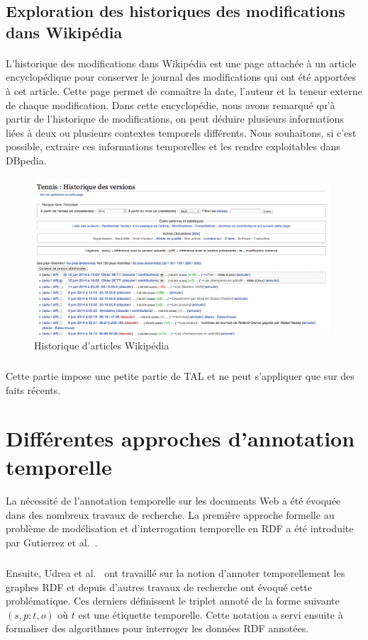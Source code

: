 \subsection{Exploration des historiques des modifications dans Wikipédia}
\paragraph{}
L'historique des modifications dans Wikipédia est une page attachée à un article encyclopédique pour conserver le journal des modifications qui ont été apportées à cet article. Cette page permet de connaître la date, l'auteur et la teneur externe de chaque modification.
Dans cette encyclopédie, nous avons remarqué qu'à partir de l'historique de modifications, on peut déduire plusieurs informations liées à deux ou plusieurs contextes temporels différents.
Nous souhaitons, si c’est possible, extraire ces informations temporelles et les rendre exploitables dans DBpedia.
\begin{figure}[H]
\centering
\includegraphics[width=11cm]{NEWHISTORIQUE.png}
\caption{Historique d'articles Wikipédia}
\end{figure}
\subparagraph{}
Cette partie impose une petite partie de TAL et ne peut s'appliquer que sur des faits récents.
\section{Différentes approches d'annotation temporelle}			
\paragraph{}
La nécessité de l’annotation temporelle sur les documents Web a été évoquée dans des nombreux travaux de recherche. La première approche formelle au problème de modélisation et d’interrogation temporelle en RDF a été introduite par Gutierrez et al.~\cite{gutierrez2005}.
\subparagraph{}
Ensuite, Udrea et al.~\cite{udrea2006} ont travaillé sur la notion d'annoter temporellement les graphes RDF et depuis d'autres travaux de recherche ont évoqué cette problématique.
Ces derniers définissent le triplet annoté de la forme suivante $(s,p:t,o)$ où $t$ est une étiquette temporelle. Cette notation a servi ensuite à formaliser des algorithmes pour interroger les données RDF annotées.
